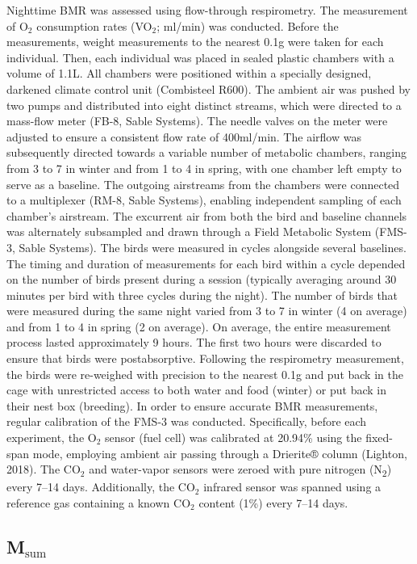 \documentclass[10pt, twoside]{book} %
\begin{document}
Nighttime BMR was assessed using flow-through respirometry. The measurement of O$_{\text{2}}$ consumption rates (VO$_{\text{2}}$; ml/min) was conducted. Before the measurements, weight measurements to the nearest 0.1g were taken for each individual. Then, each individual was placed in sealed plastic chambers with a volume of 1.1L. All chambers were positioned within a specially designed, darkened climate control unit (Combisteel R600). The ambient air was pushed by two pumps and distributed into eight distinct streams, which were directed to a mass-flow meter (FB-8, Sable Systems). The needle valves on the meter were adjusted to ensure a consistent flow rate of 400ml/min. The airflow was subsequently directed towards a variable number of metabolic chambers, ranging from 3 to 7 in winter and from 1 to 4 in spring, with one chamber left empty to serve as a baseline. The outgoing airstreams from the chambers were connected to a multiplexer (RM-8, Sable Systems), enabling independent sampling of each chamber's airstream. The excurrent air from both the bird and baseline channels was alternately subsampled and drawn through a Field Metabolic System (FMS-3, Sable Systems). The birds were measured in cycles alongside several baselines. The timing and duration of measurements for each bird within a cycle depended on the number of birds present during a session (typically averaging around 30 minutes per bird with three cycles during the night). The number of birds that were measured during the same night varied from 3 to 7 in winter (4 on average) and from 1 to 4 in spring (2 on average). On average, the entire measurement process lasted approximately 9 hours. The first two hours were discarded to ensure that birds were postabsorptive. Following the respirometry measurement, the birds were re-weighed with precision to the nearest 0.1g and put back in the cage with unrestricted access to both water and food (winter) or put back in their nest box (breeding). In order to ensure accurate BMR measurements, regular calibration of the FMS-3 was conducted. Specifically, before each experiment, the O$_{\text{2}}$ sensor (fuel cell) was calibrated at 20.94\% using the fixed-span mode, employing ambient air passing through a Drierite® column (Lighton, 2018). The CO$_{\text{2}}$ and water-vapor sensors were zeroed with pure nitrogen (N\textsubscript{2}) every 7–14 days. Additionally, the CO$_{\text{2}}$ infrared sensor was spanned using a reference gas containing a known CO$_{\text{2}}$ content (1\%) every 7–14 days.

\subsection*{M$_{\text{sum}}$}
\end{document}
